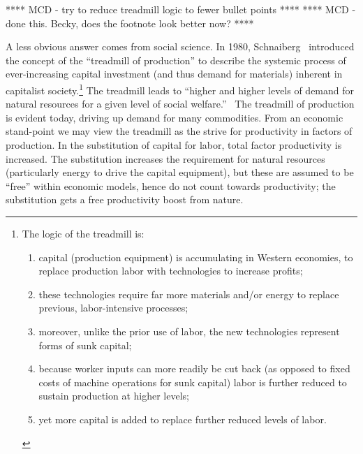 **** MCD - try to reduce treadmill logic to fewer bullet points ****
**** MCD - done this. Becky, does the footnote look better now? ****

A less obvious answer comes from social science.
In 1980, Schnaiberg~\cite{schnaiberg1980} introduced the concept of 
the ``treadmill of production'' to describe the systemic process of
ever-increasing capital investment (and thus demand for materials)
inherent in capitalist society.\footnote{
	The logic of the treadmill is:
 		\begin{enumerate}[noitemsep,topsep=0pt]
 			\item 	capital (production equipment)
 						is accumulating in Western economies, 
 						to replace production labor 
 						with technologies to increase profits; 
 			\item 	these technologies require far more materials and/or energy 
 						to replace previous, labor-intensive processes;
 			\item 	moreover, unlike the prior use of labor, 
 						the new technologies represent forms of sunk capital;
 			\item 	because worker inputs can more readily be cut back 
 						(as opposed to fixed costs of machine operations for sunk capital)
 						labor is further reduced to sustain production at higher levels;
 			\item	yet more capital is added to replace further reduced levels
 						of labor.\cite[p.~296]{Gould2004}
		 \end{enumerate}
 }
The treadmill leads to ``higher and higher levels of demand for natural resources 
for a given level of social welfare.''~\cite[p.297]{Gould2004}
The treadmill of production is evident today, 
driving up demand for many commodities.
From an economic stand-point we may view the treadmill
as the strive for productivity in factors of production.
In the substitution of capital for labor,
total factor productivity is increased.
The substitution increases the requirement for natural resources
(particularly energy to drive the capital equipment),
but these are assumed to be ``free'' within economic models,
hence do not count towards productivity;
the substitution gets a free productivity boost from nature.

